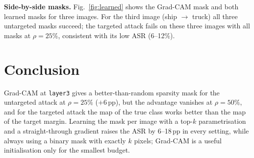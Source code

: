 \documentclass[10pt,a4paper]{article}
\begin{document}
\textbf{Side-by-side masks.} Fig.~\ref{fig:learned} shows the Grad-CAM mask and both
learned masks for three images. For the third image (ship $\to$ truck) all three
untargeted masks succeed; the targeted attack fails on these three images with all
masks at $\rho=25\%$, consistent with its low ASR (6--12\%).

\section{Conclusion}

Grad-CAM at \texttt{layer3} gives a better-than-random sparsity mask for the
untargeted attack at $\rho=25\%$ ($+6$\,pp), but the advantage vanishes at $\rho=50\%$,
and for the targeted attack the map of the true class works better than the map of
the target margin. Learning the mask per image with a top-$k$ parametrisation and a
straight-through gradient raises the ASR by 6--18\,pp in every setting, while always
using a binary mask with exactly $k$ pixels; Grad-CAM is a useful initialisation
only for the smallest budget.
\end{document}
